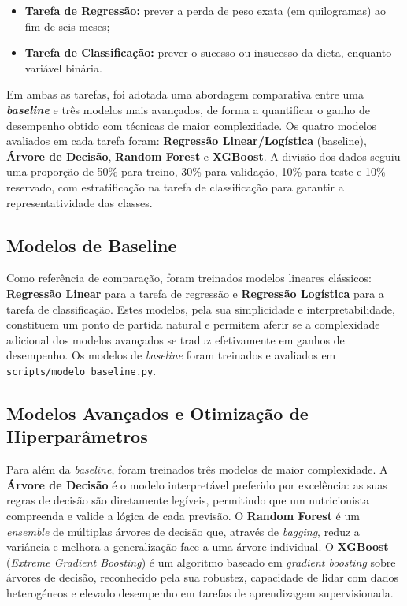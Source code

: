 \begin{itemize}
    \item \textbf{Tarefa de Regressão:} prever a perda de peso exata (em quilogramas) ao fim de seis meses;
    \item \textbf{Tarefa de Classificação:} prever o sucesso ou insucesso da dieta, enquanto variável binária.
\end{itemize}

Em ambas as tarefas, foi adotada uma abordagem comparativa entre uma \textbf{\textit{baseline}} e três modelos mais avançados, de forma a quantificar o ganho de desempenho obtido com técnicas de maior complexidade. Os quatro modelos avaliados em cada tarefa foram: \textbf{Regressão Linear/Logística} (baseline), \textbf{Árvore de Decisão}, \textbf{Random Forest} e \textbf{XGBoost}. A divisão dos dados seguiu uma proporção de 50\% para treino, 30\% para validação, 10\% para teste e 10\% reservado, com estratificação na tarefa de classificação para garantir a representatividade das classes.

\subsection{Modelos de Baseline}

Como referência de comparação, foram treinados modelos lineares clássicos: \textbf{Regressão Linear} para a tarefa de regressão e \textbf{Regressão Logística} para a tarefa de classificação. Estes modelos, pela sua simplicidade e interpretabilidade, constituem um ponto de partida natural e permitem aferir se a complexidade adicional dos modelos avançados se traduz efetivamente em ganhos de desempenho. Os modelos de \textit{baseline} foram treinados e avaliados em \texttt{scripts/modelo\_baseline.py}.

\subsection{Modelos Avançados e Otimização de Hiperparâmetros}

Para além da \textit{baseline}, foram treinados três modelos de maior complexidade. A \textbf{Árvore de Decisão} é o modelo interpretável preferido por excelência: as suas regras de decisão são diretamente legíveis, permitindo que um nutricionista compreenda e valide a lógica de cada previsão. O \textbf{Random Forest} é um \textit{ensemble} de múltiplas árvores de decisão que, através de \textit{bagging}, reduz a variância e melhora a generalização face a uma árvore individual. O \textbf{XGBoost} (\textit{Extreme Gradient Boosting}) é um algoritmo baseado em \textit{gradient boosting} sobre árvores de decisão, reconhecido pela sua robustez, capacidade de lidar com dados heterogéneos e elevado desempenho em tarefas de aprendizagem supervisionada.

